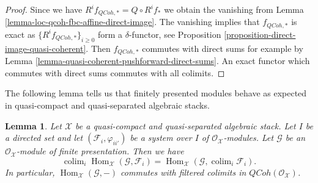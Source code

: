 \documentclass{stacks-project}
\theoremstyle{plain}
\newtheorem{lemma}[subsection]{Lemma}
\theoremstyle{definition}
\theoremstyle{remark}
\numberwithin{equation}{subsection}
\def\colim{\mathop{\mathrm{colim}}\nolimits}
\def\Hom{\mathop{\mathrm{Hom}}\nolimits}
\def\QCoh{\mathit{QCoh}}
\begin{document}
\begin{proof}
Since we have $R^if_{\QCoh, *} = Q \circ R^if_*$ we obtain the
vanishing from Lemma \ref{lemma-loc-qcoh-fbc-affine-direct-image}.
The vanishing implies that $f_{\QCoh, *}$ is exact as
$\{R^if_{\QCoh, *}\}_{i \geq 0}$ form a $\delta$-functor, see
Proposition \ref{proposition-direct-image-quasi-coherent}.
Then $f_{\QCoh, *}$ commutes with direct sums for example by
Lemma \ref{lemma-quasi-coherent-pushforward-direct-sums}.
An exact functor which commutes with direct sums commutes
with all colimits.
\end{proof}

\noindent
The following lemma tells us that finitely presented modules behave
as expected in quasi-compact and quasi-separated algebraic stacks.

\begin{lemma}
\label{lemma-finite-presentation-quasi-compact-colimit}
Let $\mathcal{X}$ be a quasi-compact and quasi-separated algebraic stack.
Let $I$ be a directed set and let $(\mathcal{F}_i, \varphi_{ii'})$ be a
system over $I$ of $\mathcal{O}_\mathcal{X}$-modules. Let $\mathcal{G}$ be an
$\mathcal{O}_\mathcal{X}$-module of finite presentation. Then we have
$$
\colim_i \Hom_\mathcal{X}(\mathcal{G}, \mathcal{F}_i)
=
\Hom_\mathcal{X}(\mathcal{G}, \colim_i \mathcal{F}_i).
$$
In particular, $\Hom_\mathcal{X}(\mathcal{G}, -)$ commutes with filtered
colimits in $\QCoh(\mathcal{O}_\mathcal{X})$.
\end{lemma}
\end{document}
